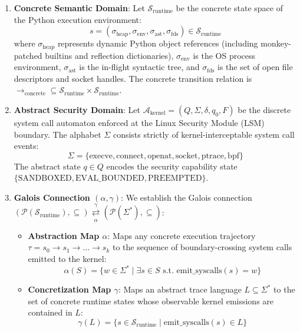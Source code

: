 \documentclass[
  10pt,letterpaper]{article}
\providecommand{\tightlist}{%
  \setlength{\itemsep}{0pt}\setlength{\parskip}{0pt}}
\begin{document}
\begin{enumerate}
\def\labelenumi{\arabic{enumi}.}
\item
  \textbf{Concrete Semantic Domain}: Let
  \(\mathcal{S}_{\text{runtime}}\) be the concrete state space of the
  Python execution environment:
  \[s = (\sigma_{\text{heap}}, \sigma_{\text{env}}, \sigma_{\text{ast}}, \sigma_{\text{fds}}) \in \mathcal{S}_{\text{runtime}}\]
  where \(\sigma_{\text{heap}}\) represents dynamic Python object
  references (including monkey-patched builtins and reflection
  dictionaries), \(\sigma_{\text{env}}\) is the OS process environment,
  \(\sigma_{\text{ast}}\) is the in-flight syntactic tree, and
  \(\sigma_{\text{fds}}\) is the set of open file descriptors and socket
  handles. The concrete transition relation is
  \(\to_{\text{concrete}} \subseteq \mathcal{S}_{\text{runtime}} \times \mathcal{S}_{\text{runtime}}\).
\item
  \textbf{Abstract Security Domain}: Let
  \(\mathcal{A}_{\text{kernel}} = (Q, \Sigma, \delta, q_0, F)\) be the
  discrete system call automaton enforced at the Linux Security Module
  (LSM) boundary. The alphabet \(\Sigma\) consists strictly of
  kernel-interceptable system call events:
  \[\Sigma = \{\text{execve}, \text{connect}, \text{openat}, \text{socket}, \text{ptrace}, \text{bpf}\}\]
  The abstract state \(q \in Q\) encodes the security capability state
  \(\{ \text{SANDBOXED}, \text{EVAL\_BOUNDED}, \text{PREEMPTED} \}\).
\item
  \textbf{Galois Connection \((\alpha, \gamma)\)}: We establish the
  Galois connection
  \((\mathcal{P}(\mathcal{S}_{\text{runtime}}), \subseteq) \underset{\alpha}{\overset{\gamma}{\rightleftarrows}} (\mathcal{P}(\Sigma^*), \subseteq)\):

  \begin{itemize}
  \tightlist
  \item
    \textbf{Abstraction Map \(\alpha\)}: Maps any concrete execution
    trajectory \(\tau = s_0 \to s_1 \to \dots \to s_k\) to the sequence
    of boundary-crossing system calls emitted to the kernel:
    \[\alpha(S) = \{ w \in \Sigma^* \mid \exists s \in S \text{ s.t. } \text{emit\_syscalls}(s) = w \}\]
  \item
    \textbf{Concretization Map \(\gamma\)}: Maps an abstract trace
    language \(L \subseteq \Sigma^*\) to the set of concrete runtime
    states whose observable kernel emissions are contained in \(L\):
    \[\gamma(L) = \{ s \in \mathcal{S}_{\text{runtime}} \mid \text{emit\_syscalls}(s) \in L \}\]
  \end{itemize}
\end{enumerate}
\end{document}
